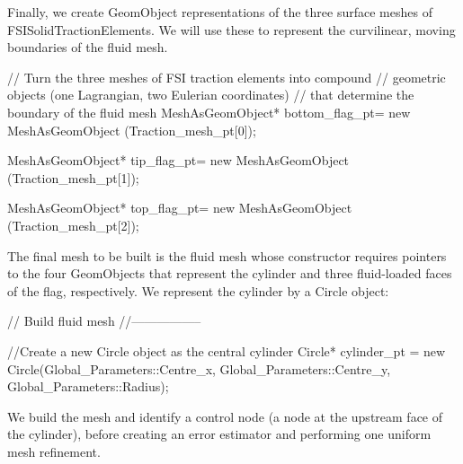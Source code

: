 Finally, we create {\ttfamily Geom\+Object} representations of the three surface meshes of {\ttfamily F\+S\+I\+Solid\+Traction\+Elements}. We will use these to represent the curvilinear, moving boundaries of the fluid mesh.


\begin{DoxyCodeInclude}


 \textcolor{comment}{// Turn the three meshes of FSI traction elements into compound}
 \textcolor{comment}{// geometric objects (one Lagrangian, two Eulerian coordinates)}
 \textcolor{comment}{// that determine the boundary of the fluid mesh}
 MeshAsGeomObject*
  bottom\_flag\_pt=
  \textcolor{keyword}{new} MeshAsGeomObject
  (Traction\_mesh\_pt[0]);
 
 MeshAsGeomObject* tip\_flag\_pt=
  \textcolor{keyword}{new} MeshAsGeomObject
  (Traction\_mesh\_pt[1]);
 
 MeshAsGeomObject* top\_flag\_pt=
  \textcolor{keyword}{new} MeshAsGeomObject
  (Traction\_mesh\_pt[2]);

\end{DoxyCodeInclude}


The final mesh to be built is the fluid mesh whose constructor requires pointers to the four {\ttfamily Geom\+Objects} that represent the cylinder and three fluid-\/loaded faces of the flag, respectively. We represent the cylinder by a {\ttfamily Circle} object\+:


\begin{DoxyCodeInclude}


 \textcolor{comment}{// Build fluid mesh}
 \textcolor{comment}{//-----------------}

 \textcolor{comment}{//Create a new Circle object as the central cylinder}
 Circle* cylinder\_pt = \textcolor{keyword}{new} Circle(Global\_Parameters::Centre\_x,
                                  Global\_Parameters::Centre\_y,
                                  Global\_Parameters::Radius);

\end{DoxyCodeInclude}


We build the mesh and identify a control node (a node at the upstream face of the cylinder), before creating an error estimator and performing one uniform mesh refinement.


